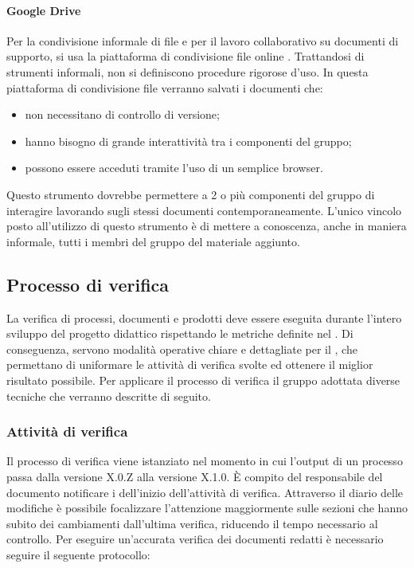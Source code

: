 \documentclass[12pt,a4paper]{article}
\begin{document}
\paragraph{Google Drive}
Per la condivisione informale di file e per il lavoro collaborativo su documenti di supporto, si usa la piattaforma di condivisione file online . Trattandosi di strumenti informali, non si definiscono procedure rigorose d’uso. In questa piattaforma di condivisione file verranno salvati i documenti che:
\begin{itemize}
	\item non necessitano di controllo di versione;
	\item hanno bisogno di grande interattività tra i componenti del gruppo;
	\item possono essere acceduti tramite l’uso di un semplice browser.
\end{itemize}

Questo strumento dovrebbe permettere a 2 o più componenti del gruppo di interagire lavorando sugli stessi documenti contemporaneamente.
L'unico vincolo posto all'utilizzo di questo strumento è di mettere a conoscenza, anche in maniera informale, tutti i membri del gruppo del materiale aggiunto.

\subsection{Processo di verifica}

La verifica di processi, documenti e prodotti deve essere eseguita durante l'intero sviluppo del progetto didattico rispettando le metriche definite nel \PdQ{}. Di conseguenza, servono modalità operative chiare e dettagliate per il \VR, che permettano di uniformare le attività di verifica svolte ed ottenere il miglior risultato possibile. Per applicare il processo di verifica il gruppo adottata diverse tecniche che verranno descritte di seguito.

\subsubsection{Attività di verifica}

Il processo di verifica viene istanziato nel momento in cui l'output di un processo passa dalla versione X.0.Z alla versione X.1.0. È compito del responsabile del documento notificare i \VRpl{} dell'inizio dell'attività di verifica. Attraverso il diario delle modifiche è possibile focalizzare l'attenzione maggiormente sulle sezioni che hanno subito dei cambiamenti dall'ultima verifica, riducendo il tempo necessario al controllo. Per eseguire un'accurata verifica dei documenti redatti è necessario seguire il seguente protocollo:
\end{document}
